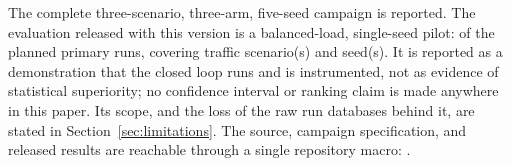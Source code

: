 \ifFullCampaign
The complete three-scenario, three-arm, five-seed campaign is reported.
\else
The evaluation released with this version is a balanced-load, single-seed pilot: \ValidRunCount{} of the \ExpectedRunCount{} planned primary runs, covering \AvailableScenarioCount{} traffic scenario(s) and \AvailableSeedCount{} seed(s). It is reported as a demonstration that the closed loop runs and is instrumented, not as evidence of statistical superiority; no confidence interval or ranking claim is made anywhere in this paper. Its scope, and the loss of the raw run databases behind it, are stated in Section~\ref{sec:limitations}.
\fi
The source, campaign specification, and released results are reachable through a single repository macro: \codeurlprinted.
